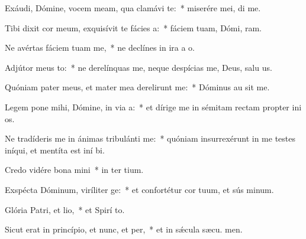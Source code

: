 \item Exáudi, Dómine, vocem meam, qua clamávi  te:~* miserére mei,  di me.
\item Tibi dixit cor meum, exquisívit te fácies a:~* fáciem tuam, Dómi, ram.
\item Ne avértas fáciem tuam  me,~* ne declínes in ira a  o.
\item Adjútor meus to:~* ne derelínquas me, neque despícias me, Deus, salu us.
\item Quóniam pater meus, et mater mea derelirunt me:~* Dóminus au sit me.
\item Legem pone mihi, Dómine, in via a:~* et dírige me in sémitam rectam propter ini os.
\item Ne tradíderis me in ánimas tribulánti me:~* quóniam insurrexérunt in me testes iníqui, et mentíta est iní bi.
\item Credo vidére bona mini~* in ter tium.
\item Exspécta Dóminum, viríliter ge:~* et confortétur cor tuum, et sús minum.
\item Glória Patri, et lio,~* et Spirí to.
\item Sicut erat in princípio, et nunc, et per,~* et in sǽcula sæcu. men.

